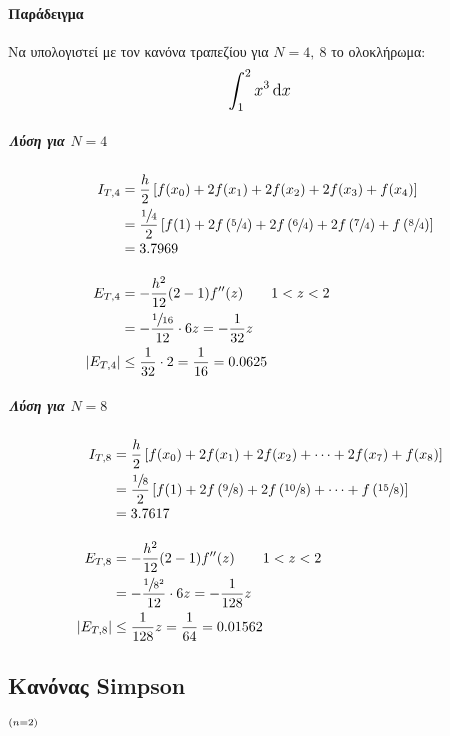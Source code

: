 \documentclass[11pt,a4paper,notitlepage,fleqn,final]{article}
\begin{document}
    \paragraph{Παράδειγμα}
    Να υπολογιστεί με τον κανόνα τραπεζίου για \( N=4,\ 8 \) το
    ολοκλήρωμα:
    \[
    \mathlarger{\int_{1}^{2} x^3\dif x}
    \]
    \subparagraph{Λύση για \( N=4 \)}
    \begin{align*}
    	I_{T,4} &= \frac{h}{2} \left[
    	f(x_0)+2f(x_1)+2f(x_2)+2f(x_3)+f(x_4)
    	\right] \\ &= \frac{\sfrac{1}{4} }{2}\left[
    	f(1)+2f\left(\sfrac{5}{4}\right)+2f\left(\sfrac{6}{4}\right)
    	+2f\left(\sfrac{7}{4}\right)+f\left(\sfrac{8}{4}\right)
    	\right]
    	\\ &= 3.7969 \\[3ex]
    	E_{T,4} &= -\frac{h^2}{12}(2-1)f''(z) \qquad 1<z<2 \\
    	&= - \frac{\sfrac{1}{16} }{12} \cdot 6z = -\frac{1}{32}z
    	\\ \left|E_{T,4}\right| &\leq \frac{1}{32}\cdot 2
    	=\frac{1}{16} = 0.0625
    \end{align*}

    \subparagraph{Λύση για \( N=8 \)}
    \begin{align*}
        I_{T,8} &= \frac{h}{2} \left[
        f(x_0)+2f(x_1)+2f(x_2)+\dots+2f(x_7)+f(x_8)
        \right] \\ &= \frac{\sfrac{1}{8} }{2}\left[
        f(1)+2f\left(\sfrac{9}{8}\right)+2f\left(\sfrac{10}{8}\right)
        +\dots+f\left(\sfrac{15}{8}\right)
        \right]
        \\ &= 3.7617 \\[3ex]
    	E_{T,8} &= -\frac{h^2}{12}(2-1)f''(z) \qquad 1<z<2 \\
    	&= -\frac{\sfrac{1}{8^2} }{12}\cdot 6z=-\frac{1}{128}z \\
    	|E_{T,8}| &\leq \frac{1}{128}z=\frac{1}{64}=0.01562
    \end{align*}

    \subsection{Κανόνας Simpson}
    \( \mathsmaller{(n = 2)} \)

\end{document}
